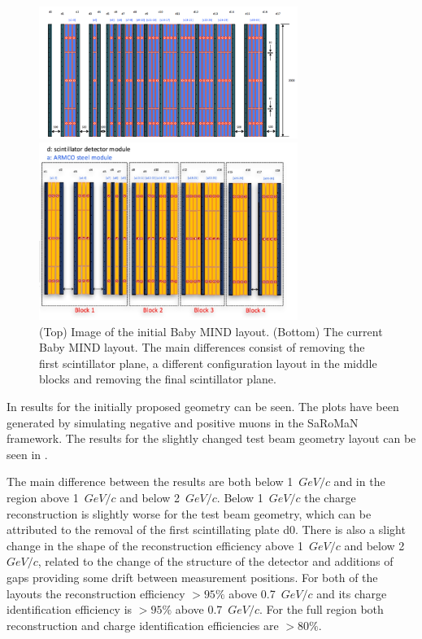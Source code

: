 \begin{figure}[h!]
\centering
\includegraphics[width=0.75\textwidth]{figures/oldStudies/oldMIND.png}

\includegraphics[width=0.75\textwidth]{figures/MIND.jpeg}
\caption{(Top) Image of the initial Baby MIND layout. (Bottom) The current Baby MIND layout. The main differences consist of removing the first scintillator plane, a different configuration layout in the middle blocks and removing the final scintillator plane.}
\label{fig:oldMIND}
\end{figure}

In  results for the initially proposed geometry can be seen. The plots have been generated by simulating negative and positive muons in the SaRoMaN framework. The results for the slightly changed test beam geometry layout can be seen in  . 

The main difference between the results are both below 1~$GeV/c$ and in the region above 1~$GeV/c$ and below 2~$GeV/c$. Below 1~$GeV/c$ the charge reconstruction is slightly worse for the test beam geometry, which can be attributed to the removal of the first scintillating plate d0. There is also a slight change in the shape of the reconstruction efficiency above 1~$GeV/c$ and below 2~$GeV/c$, related to the change of the structure of the detector and additions of gaps providing some drift between measurement positions. For both of the layouts the reconstruction efficiency $> 95\%$ above 0.7~$GeV/c$ and its charge identification efficiency is $> 95\%$ above 0.7~$GeV/c$. For the full region both reconstruction and charge identification efficiencies are $> 80\% $. 

